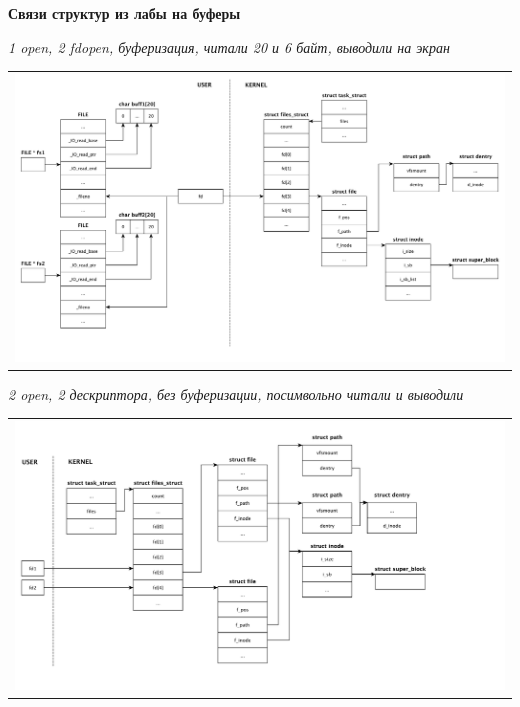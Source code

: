 \textbf{Связи структур из лабы на буферы}

\textit{1 open, 2 fdopen, буферизация, читали 20 и 6 байт, выводили на экран}
\begin{table}[h!]
  \centering
  \begin{tabular}{p{1\linewidth}}
    \centering
    \includegraphics[width=0.8\linewidth]{./images/scheme1.pdf}
  \end{tabular}
\end{table}

\textit{2 open, 2 дескриптора, без буферизации, посимвольно читали и выводили}
\begin{table}[h!]
  \centering
  \begin{tabular}{p{1\linewidth}}
    \centering
    \includegraphics[width=0.8\linewidth]{./images/scheme2.pdf}
  \end{tabular}
\end{table}

